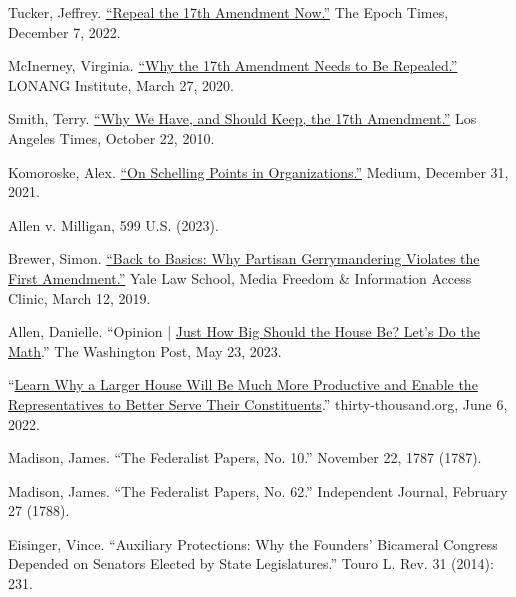 \documentclass{article}
\newcommand{\quotes}[1]{``#1''}
\begin{document}
\begin{thebibliography}{20}
Tucker, Jeffrey. \href{https://www.theepochtimes.com/repeal-the-17th-amendment-now\_4909126.html}{\quotes{Repeal the 17th Amendment Now.}} The Epoch Times, December 7, 2022.

McInerney, Virginia. \href{https://lonang.com/commentaries/conlaw/federalism/repeal-seventeenth-amendment/}{\quotes{Why the 17th Amendment Needs to Be Repealed.}} LONANG Institute, March 27, 2020.

Smith, Terry. \href{https://www.latimes.com/archives/la-xpm-2010-oct-22-la-oew-smith-17th-amendment-20101022-story.html}{\quotes{Why We Have, and Should Keep, the 17th Amendment.}} Los Angeles Times, October 22, 2010.

Komoroske, Alex. \href{https://medium.com/@komorama/on-schelling-points-in-organizations-e90647cdd81b}{\quotes{On Schelling Points in Organizations.}} Medium, December 31, 2021.

Allen v. Milligan, 599 U.S. (2023).

Brewer, Simon. \href{https://law.yale.edu/mfia/case-disclosed/back-basics-why-partisan-gerrymandering-violates-first-amendment}{\quotes{Back to Basics: Why Partisan Gerrymandering Violates the First Amendment.}} Yale Law School, Media Freedom \& Information Access Clinic, March 12, 2019.

Allen, Danielle. \quotes{Opinion | \href{https://www.washingtonpost.com/opinions/2023/03/28/danielle-allen-democracy-reform-house-representatives-districts/}{Just How Big Should the House Be? Let’s Do the Math}.} The Washington Post, May 23, 2023. 

 \quotes{\href{https://thirty-thousand.org/the-house-of-representatives-is-scalable/}{Learn Why a Larger House Will Be Much More Productive and Enable the Representatives to Better Serve Their Constituents}.} thirty-thousand.org, June 6, 2022.

Madison, James. \quotes{The Federalist Papers, No. 10.} November 22, 1787 (1787).

Madison, James. \quotes{The Federalist Papers, No. 62.} Independent Journal, February 27 (1788).

Eisinger, Vince. \quotes{Auxiliary Protections: Why the Founders' Bicameral Congress Depended on Senators Elected by State Legislatures.} Touro L. Rev. 31 (2014): 231.


\end{thebibliography}
\end{document}
